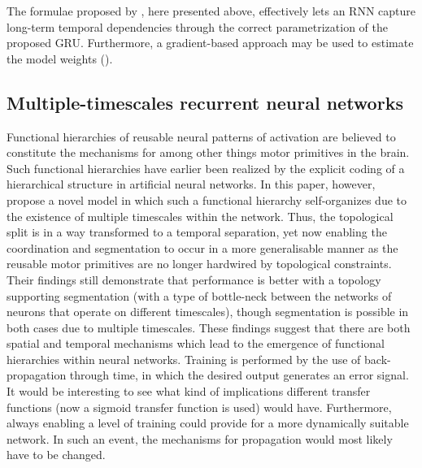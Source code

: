The formulae proposed by \cite{Cho2014}, here presented above, effectively lets an RNN capture long-term temporal dependencies through the correct parametrization of the proposed GRU. Furthermore, a gradient-based approach may be used to estimate the model weights (\cite{Cho2014}).


\subsection{Multiple-timescales recurrent neural networks}

Functional hierarchies of reusable neural patterns of activation are believed to constitute the mechanisms for among other things motor primitives in the brain. Such functional hierarchies have earlier been realized by the explicit coding of a hierarchical structure in artificial neural networks. In this paper, however, \cite{Yamashita2008} propose a novel model in which such a functional hierarchy self-organizes due to the existence of multiple timescales within the network. Thus, the topological split is in a way transformed to a temporal separation, yet now enabling the coordination and segmentation to occur in a more generalisable manner as the reusable motor primitives are no longer hardwired by topological constraints. Their findings still demonstrate that performance is better with a topology supporting segmentation (with a type of bottle-neck between the networks of neurons that operate on different timescales), though segmentation is possible in both cases due to multiple timescales. These findings suggest that there are both spatial and temporal mechanisms which lead to the emergence of functional hierarchies within neural networks. Training is performed by the use of back-propagation through time, in which the desired output generates an error signal. It would be interesting to see what kind of implications different transfer functions (now a sigmoid transfer function is used) would have. Furthermore, always enabling a level of training could provide for a more dynamically suitable network. In such an event, the mechanisms for propagation would most likely have to be changed.

